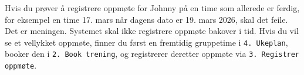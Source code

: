 \documentclass[11pt,a4paper]{article}
\begin{document}
Hvis du prøver å registrere oppmøte for Johnny på en time som allerede er ferdig,
for eksempel en time 17. mars når dagens dato er 19. mars 2026, skal det feile.
Det er meningen. Systemet skal ikke registrere oppmøte bakover i tid. Hvis du vil
se et vellykket oppmøte, finner du først en fremtidig gruppetime i
\texttt{4. Ukeplan}, booker den i \texttt{2. Book trening}, og registrerer
deretter oppmøte via \texttt{3. Registrer oppmøte}.
\end{document}
